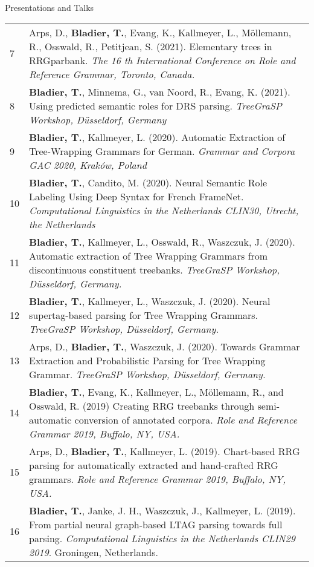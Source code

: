 \documentclass{resume} %
\begin{document}
\begin{rSection}{Presentations and Talks}
\begin{tabular}{p{0.1cm}p{17cm}}
7 & Arps, D., {\bf Bladier, T.}, Evang, K., Kallmeyer, L., Möllemann, R., Osswald, R., Petitjean, S. (2021). Elementary trees in RRGparbank. \textit{The 16 th International Conference on Role and Reference Grammar, Toronto, Canada.} \\[5pt]

8 & {\bf Bladier, T.}, Minnema, G., van Noord, R., Evang, K. (2021). Using predicted semantic roles for DRS parsing. \textit{TreeGraSP Workshop, Düsseldorf, Germany} \\[5pt]

9 & {\bf Bladier, T.}, Kallmeyer, L. (2020). Automatic Extraction of Tree-Wrapping Grammars for German. \textit{Grammar and Corpora GAC 2020, Kraków, Poland} \\[5pt]

10 & {\bf Bladier, T.}, Candito, M. (2020). Neural Semantic Role Labeling Using Deep Syntax for French FrameNet. \textit{Computational Linguistics in the Netherlands CLIN30, Utrecht, the Netherlands} \\[5pt]


11 & {\bf Bladier, T.}, Kallmeyer, L., Osswald, R., Waszczuk, J. (2020). Automatic extraction of Tree Wrapping Grammars from discontinuous constituent treebanks. \textit{TreeGraSP Workshop, Düsseldorf, Germany.} \\[5pt]

12 & {\bf Bladier, T.}, Kallmeyer, L., Waszczuk, J. (2020). Neural supertag-based parsing for Tree Wrapping Grammars. \textit{TreeGraSP Workshop, Düsseldorf, Germany.} \\[5pt]

13 & Arps, D., {\bf Bladier, T.}, Waszczuk, J. (2020). Towards Grammar Extraction and Probabilistic Parsing for Tree Wrapping Grammar. \textit{TreeGraSP Workshop, Düsseldorf, Germany.} \\[5pt]

14 & {\bf Bladier, T.}, Evang, K., Kallmeyer, L., Möllemann, R., and Osswald, R. (2019) Creating RRG treebanks through semi-automatic conversion of annotated corpora. \textit{Role and Reference Grammar 2019, Buffalo, NY, USA.} \\[5pt]
15 & Arps, D., {\bf Bladier, T.}, Kallmeyer, L. (2019). Chart-based RRG parsing for automatically extracted and hand-crafted RRG grammars. \textit{Role and Reference Grammar 2019, Buffalo, NY, USA.} \\[5pt]
 
16 & {\bf Bladier, T.}, Janke, J. H., Waszczuk, J., Kallmeyer, L. (2019). From partial neural graph-based LTAG parsing towards full parsing.  {\it Computational Linguistics in the Netherlands CLIN29 2019}. Groningen, Netherlands.  \\[5pt]


\end{tabular}
\end{rSection}
\end{document}
